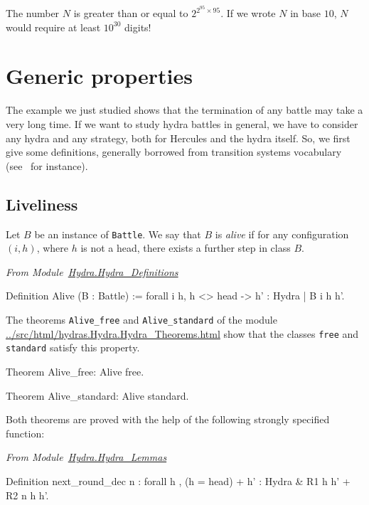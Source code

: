 \documentclass[a4paper]{book}
\begin{document}
The number $N$ is greater than or  equal to $2^{2^{95}\times 95}.$ If we wrote $N$ in base $10$, $N$ would require at least $10^{30}$ digits!


\section{Generic properties}


The example we just studied shows that the termination of any battle may take a very long time. If we want to study hydra battles in general, we have to consider 
any hydra and any strategy, both for Hercules and the hydra itself. So, we first  give some definitions, generally borrowed from transition systems vocabulary (see~\cite{tel_2000} for instance).


\subsection{Liveliness}


Let $B$ be an instance of \texttt{Battle}. We say that $B$ is \emph{alive} if
for any configuration $(i,h)$, where $h$ is not a head, there exists a further step in class $B$.


\vspace{4pt}
\emph{From Module~\href{../src/html/hydras.Hydra.Hydra_Definitions.html\#Alive}{Hydra.Hydra\_Definitions}}

\begin{Coqsrc}
Definition Alive (B : Battle) :=
  forall i h, 
     h <> head -> {h' : Hydra |  B i h h'}.
\end{Coqsrc}

The theorems \texttt{Alive\_free} and \texttt{Alive\_standard} of the module 
\url{../src/html/hydras.Hydra.Hydra_Theorems.html} show that the classes \texttt{free} and \texttt{standard} satisfy this property.

\begin{Coqsrc}
Theorem Alive_free: Alive free.

Theorem Alive_standard: Alive standard.  
\end{Coqsrc}

Both theorems are proved with the help of the  following strongly specified function:

\vspace{4pt}
\emph{From Module~\href{../src/html/hydras.Hydra.Hydra_Lemmas.html\#next_round_dec}{Hydra.Hydra\_Lemmas}}

\begin{Coqsrc}
Definition  next_round_dec n :
 forall h , (h = head) + {h' : Hydra & {R1 h h'} + {R2  n h  h'}}.
\end{Coqsrc}
\end{document}

